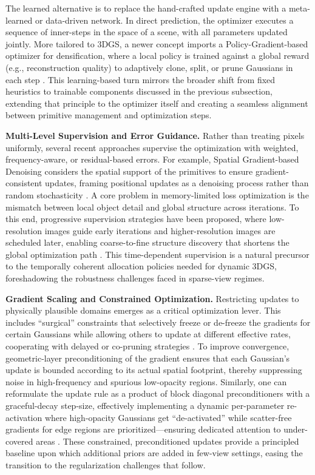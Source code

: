 \documentclass[11pt,a4paper]{article}
\begin{document}
The learned alternative is to replace the hand-crafted update engine with a meta-learned or data-driven network. In direct prediction, the optimizer executes a sequence of inner-steps in the space of a scene, with all parameters updated jointly. More tailored to 3DGS, a newer concept imports a Policy-Gradient-based optimizer for densification, where a local policy is trained against a global reward (e.g., reconstruction quality) to adaptively clone, split, or prune Gaussians in each step \cite{arxiv:2605.00408v2}. This learning-based turn mirrors the broader shift from fixed heuristics to trainable components discussed in the previous subsection, extending that principle to the optimizer itself and creating a seamless alignment between primitive management and optimization steps.

\textbf{Multi-Level Supervision and Error Guidance.} Rather than treating pixels uniformly, several recent approaches supervise the optimization with weighted, frequency-aware, or residual-based errors. For example, Spatial Gradient-based Denoising considers the spatial support of the primitives to ensure gradient-consistent updates, framing positional updates as a denoising process rather than random stochasticity \cite{arxiv:2605.14880v1}. A core problem in memory-limited loss optimization is the mismatch between local object detail and global structure across iterations. To this end, progressive supervision strategies have been proposed, where low-resolution images guide early iterations and higher-resolution images are scheduled later, enabling coarse-to-fine structure discovery that shortens the global optimization path \cite{arxiv:2507.20239v1}. This time-dependent supervision is a natural precursor to the temporally coherent allocation policies needed for dynamic 3DGS, foreshadowing the robustness challenges faced in sparse-view regimes.

\textbf{Gradient Scaling and Constrained Optimization.} Restricting updates to physically plausible domains emerges as a critical optimization lever. This includes ``surgical'' constraints that selectively freeze or de-freeze the gradients for certain Gaussians while allowing others to update at different effective rates, cooperating with delayed or co-pruning strategies \cite{arxiv:2603.01099v2}. To improve convergence, geometric-layer preconditioning of the gradient ensures that each Gaussian's update is bounded according to its actual spatial footprint, thereby suppressing noise in high-frequency and spurious low-opacity regions. Similarly, one can reformulate the update rule as a product of block diagonal preconditioners with a graceful-decay step-size, effectively implementing a dynamic per-parameter re-activation where high-opacity Gaussians get ``de-activated'' while scatter-free gradients for edge regions are prioritized---ensuring dedicated attention to under-covered areas \cite{arxiv:2510.19653v1}. These constrained, preconditioned updates provide a principled baseline upon which additional priors are added in few-view settings, easing the transition to the regularization challenges that follow.
\end{document}

